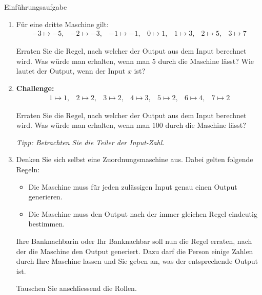 \begin{LA}{Einführungsaufgabe}{}
\begin{enumerate}
              Erraten Sie die Regel, nach welcher der Output aus dem
              Input berechnet wird.
              Was würde man erhalten, wenn man \(5\) durch die Maschine
              lässt?
              Wie lautet der Output, wenn der Input \(x\) ist?

        \item Für eine dritte Maschine gilt:
              \[
                  \begin{array}{ccccccc}
                      -3 \mapsto -5, &
                      -2 \mapsto -3, &
                      -1 \mapsto -1, &
                      0 \mapsto 1,   &
                      1 \mapsto 3,   &
                      2 \mapsto 5,   &
                      3 \mapsto 7
                  \end{array}
              \]

              Erraten Sie die Regel, nach welcher der Output aus dem
              Input berechnet wird.
              Was würde man erhalten, wenn man \(5\) durch die Maschine
              lässt?
              Wie lautet der Output, wenn der Input \(x\) ist?

        \item \textbf{Challenge:}
              \[
                  \begin{array}{ccccccc}
                      1 \mapsto 1, &
                      2 \mapsto 2, &
                      3 \mapsto 2, &
                      4 \mapsto 3, &
                      5 \mapsto 2, &
                      6 \mapsto 4, &
                      7 \mapsto 2
                  \end{array}
              \]

              Erraten Sie die Regel, nach welcher der Output aus dem
              Input berechnet wird.
              Was würde man erhalten, wenn man \(100\) durch die
              Maschine lässt?

              \emph{Tipp: Betrachten Sie die Teiler der Input-Zahl.}

        \item Denken Sie sich selbst eine Zuordnungsmaschine aus.
              Dabei gelten folgende Regeln:

              \begin{itemize}
                  \item Die Maschine muss für jeden zulässigen Input
                        genau einen Output generieren.
                  \item Die Maschine muss den Output nach der immer
                        gleichen Regel eindeutig bestimmen.
              \end{itemize}

              Ihre Banknachbarin oder Ihr Banknachbar soll nun die Regel
              erraten, nach der die Maschine den Output generiert.
              Dazu darf die Person einige Zahlen durch Ihre Maschine
              lassen und Sie geben an, was der entsprechende Output ist.

              Tauschen Sie anschliessend die Rollen.
    \end{enumerate}
\end{LA}

